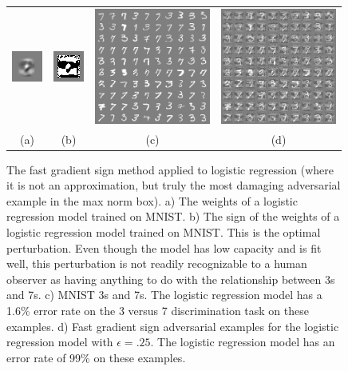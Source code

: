 \documentclass{article} %
\def\eps{{\epsilon}}
\begin{document}
\begin{figure}
    \vspace{-.05in}
    \centering
    \begin{tabular}{cccc}
        \includegraphics[width=.5in]{logreg_weights.png}    &
        \includegraphics[width=.5in]{logreg_weights_sign.png} &
        \includegraphics[width=1.5in]{logreg_clean.png}&
        \includegraphics[width=1.5in]{logreg_adv.png}    \\
            (a) & (b) & (c) & (d)
    \end{tabular}


\caption{
    The fast gradient sign method applied to logistic regression (where it is not an approximation,
    but truly the most damaging adversarial example in the max norm box).
    a) The weights of a logistic regression model trained on MNIST.
    b) The sign of the weights of a logistic regression model trained on MNIST. This is the optimal
    perturbation. Even though the model has low capacity and is fit well, this perturbation is not
    readily recognizable to a human observer as having anything to do with the relationship between
    3s and 7s.
    c) MNIST 3s and 7s. The logistic regression model has a 1.6\% error rate on the 3 versus 7 discrimination task on these examples.
    d) Fast gradient sign adversarial examples for the logistic regression model with $\eps=.25$.
        The logistic regression model has an error rate of 99\% on these examples.
}
\label{fig:logistic_adv}
\end{figure}
\end{document}
